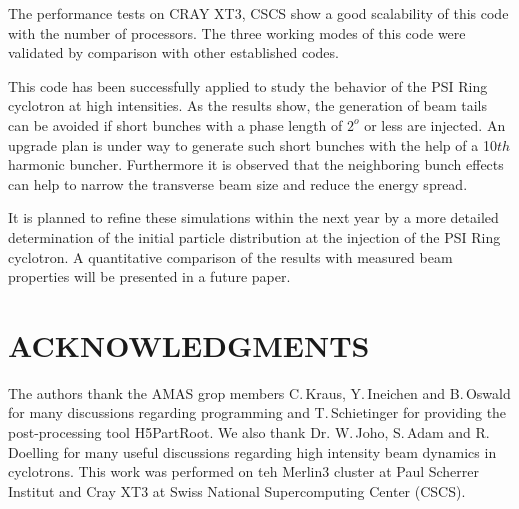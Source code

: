 \documentclass[aps,prstab,twocolumn,superscriptaddress]{revtex4}
\begin{document}
The performance tests on CRAY XT3, CSCS show a good scalability of this code with the number of processors. 
The three working modes of this code were validated by comparison with other established codes. 

This code has been successfully applied to study the behavior of the PSI Ring cyclotron at high intensities.
As the results show, the generation of beam tails can be avoided if short bunches with a phase length of $2^o$  or less are injected. 
An upgrade plan is under way to generate such short bunches with the help of a 10$th$ harmonic buncher.
Furthermore it is observed that the neighboring bunch effects can help to narrow the transverse beam size and reduce the energy spread.

It is planned to refine these simulations within the next year by a more detailed determination of the initial particle distribution at the injection
of the PSI Ring cyclotron. A quantitative comparison of the results with measured beam properties will be presented in a future paper.
\section{ACKNOWLEDGMENTS}
The authors thank the AMAS grop members C.\,Kraus, Y.\,Ineichen and B.\,Oswald for many 
discussions regarding programming and T.\,Schietinger for providing the post-processing tool
H5PartRoot. We also thank Dr. W.\,Joho, S.\,Adam and R.\,Doelling for many useful discussions regarding high
intensity beam dynamics in cyclotrons. This work was performed on teh Merlin3 cluster at Paul Scherrer Institut 
and Cray XT3 at Swiss National Supercomputing Center (CSCS). 


%
\end{document}
